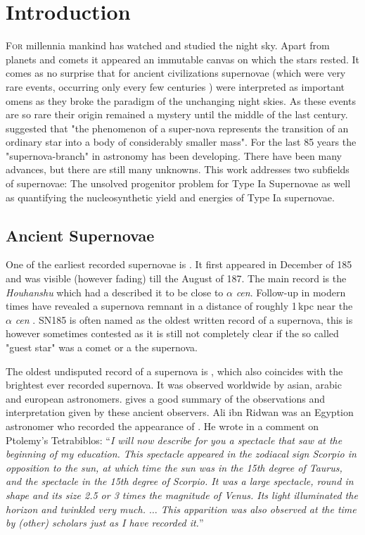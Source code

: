 \chapter{Introduction}
\label{chap:intro}

\lettrine[lines=4]{F}{or} millennia mankind has watched and studied the night sky. Apart from planets and comets it appeared an immutable canvas on which the stars rested. It comes as no surprise that for ancient civilizations supernovae (which were very rare events, occurring only every few centuries ) were interpreted as important omens as they broke the paradigm of the unchanging night skies. As these events are so rare their origin remained a mystery until the middle of the last century. \citet{1934PNAS...20..254B} suggested that "the phenomenon of a super-nova represents the transition of an ordinary star into a body of considerably smaller mass". For the last 85 years the "supernova-branch" in astronomy has been developing. There have been many advances, but there are still many unknowns. This work addresses two subfields of supernovae: The unsolved progenitor problem for Type Ia Supernovae as well as quantifying the nucleosynthetic yield and energies of Type Ia supernovae.


\section{Ancient Supernovae}
\label{sec:ancientsn}

One of the earliest recorded supernovae is . It first appeared in December of 185 and was visible (however fading) till the August of 187. The main record is the \textit{Houhanshu} \citep{2006ChJAA...6..635Z} which had a described it to be close to $\alpha$ \textit{cen}. Follow-up in modern times have revealed a supernova remnant in a distance of roughly 1\,kpc near the $\alpha$ \textit{cen} \citep{2006ChJAA...6..635Z}. SN185 is often named as the oldest written record of a supernova, this is however sometimes contested as it is still not completely clear if the so called "guest star" was a comet or a the supernova.

The oldest undisputed record of a supernova is , which also coincides with the brightest ever recorded supernova.  It was observed worldwide by asian, arabic and european astronomers. \citet{1965AJ.....70..105G} gives a good summary of the observations and interpretation given by these ancient observers. Ali ibn Ridwan was an Egyption astronomer who recorded the appearance of . He wrote in a comment on Ptolemy's Tetrabiblos: ``\textit{I will now describe for you a spectacle that saw at the beginning of my education. This spectacle appeared in the zodiacal sign Scorpio in opposition to the sun, at which time the sun was in the 15th degree of Taurus, and the spectacle in the 15th degree of Scorpio. It was a large spectacle, round in shape and its size 2.5 or 3 times the magnitude of Venus. Its light illuminated the horizon and twinkled very much. $\dots$ This apparition was also observed at the time by (other) scholars just as I have recorded it.}''

